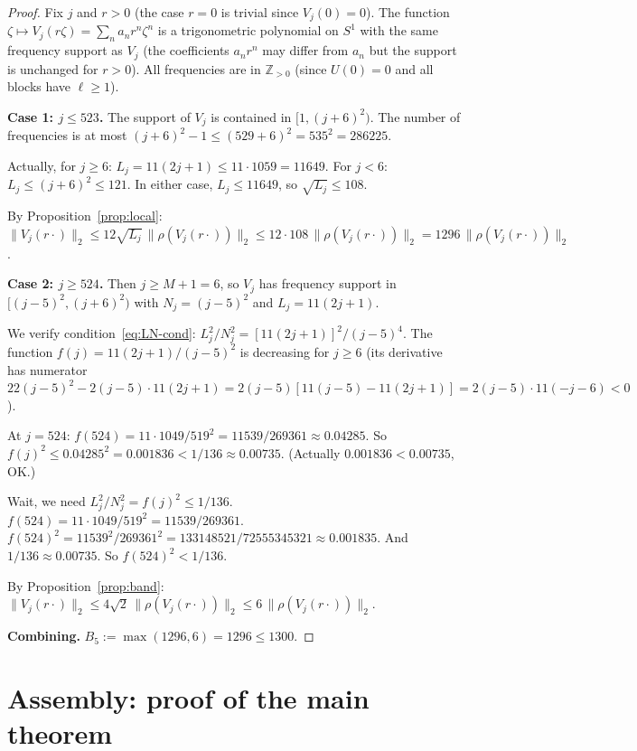 \documentclass[11pt]{article}
\newcommand{\rhof}{\rho}
\newcommand{\Zpos}{\mathbb{Z}_{>0}}
\newcommand{\norm}[1]{\lVert #1\rVert}
\begin{document}
\begin{proof}
Fix $j$ and $r > 0$ (the case $r = 0$ is trivial since $V_j(0) = 0$).
The function $\zeta \mapsto V_j(r\zeta) = \sum_n a_n r^n \zeta^n$ is a trigonometric polynomial
on $S^1$ with the same frequency support as $V_j$ (the coefficients $a_n r^n$ may differ from
$a_n$ but the support is unchanged for $r > 0$).
All frequencies are in $\Zpos$ (since $U(0)=0$ and all blocks have $\ell \ge 1$).

\medskip\noindent\textbf{Case 1: $j \le 523$.}
The support of $V_j$ is contained in $[1, (j+6)^2)$.
The number of frequencies is at most $(j+6)^2 - 1 \le (529+6)^2 = 535^2 = 286225$.

Actually, for $j \ge 6$: $L_j = 11(2j+1) \le 11\cdot 1059 = 11649$.
For $j < 6$: $L_j \le (j+6)^2 \le 121$.
In either case, $L_j \le 11649$, so $\sqrt{L_j} \le 108$.

By Proposition~\ref{prop:local}: $\norm{V_j(r\cdot)}_2 \le 12\sqrt{L_j}\,\norm{\rhof(V_j(r\cdot))}_2
\le 12\cdot 108\,\norm{\rhof(V_j(r\cdot))}_2 = 1296\,\norm{\rhof(V_j(r\cdot))}_2$.

\medskip\noindent\textbf{Case 2: $j \ge 524$.}
Then $j \ge M+1 = 6$, so $V_j$ has frequency support in $[(j-5)^2, (j+6)^2)$
with $N_j = (j-5)^2$ and $L_j = 11(2j+1)$.

We verify condition~\eqref{eq:LN-cond}: $L_j^2/N_j^2 = [11(2j+1)]^2/(j-5)^4$.
The function $f(j) = 11(2j+1)/(j-5)^2$ is decreasing for $j \ge 6$
(its derivative has numerator $22(j-5)^2 - 2(j-5)\cdot 11(2j+1)
= 2(j-5)[11(j-5)-11(2j+1)] = 2(j-5)\cdot 11(-j-6) < 0$).

At $j = 524$: $f(524) = 11\cdot 1049/519^2 = 11539/269361 \approx 0.04285$.
So $f(j)^2 \le 0.04285^2 = 0.001836 < 1/136 \approx 0.00735$. (Actually $0.001836 < 0.00735$, OK.)

Wait, we need $L_j^2/N_j^2 = f(j)^2 \le 1/136$.
$f(524) = 11 \cdot 1049 / 519^2 = 11539/269361$.
$f(524)^2 = 11539^2/269361^2 = 133148521/72555345321 \approx 0.001835$.
And $1/136 \approx 0.00735$.
So $f(524)^2 < 1/136$. \checkmark

By Proposition~\ref{prop:band}:
$\norm{V_j(r\cdot)}_2 \le 4\sqrt{2}\,\norm{\rhof(V_j(r\cdot))}_2 \le 6\,\norm{\rhof(V_j(r\cdot))}_2$.

\medskip\noindent\textbf{Combining.}
$B_5 := \max(1296, 6) = 1296 \le 1300$.
\end{proof}

\section{Assembly: proof of the main theorem}\label{sec:assembly}
\end{document}
